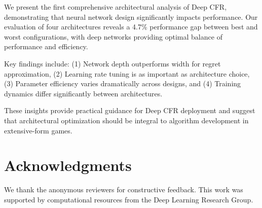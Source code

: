 \documentclass{article}
\begin{document}
We present the first comprehensive architectural analysis of Deep CFR, demonstrating that neural network design significantly impacts performance. Our evaluation of four architectures reveals a 4.7\% performance gap between best and worst configurations, with deep networks providing optimal balance of performance and efficiency.

Key findings include: (1) Network depth outperforms width for regret approximation, (2) Learning rate tuning is as important as architecture choice, (3) Parameter efficiency varies dramatically across designs, and (4) Training dynamics differ significantly between architectures.

These insights provide practical guidance for Deep CFR deployment and suggest that architectural optimization should be integral to algorithm development in extensive-form games.

\section*{Acknowledgments}
We thank the anonymous reviewers for constructive feedback. This work was supported by computational resources from the Deep Learning Research Group.
\end{document}
